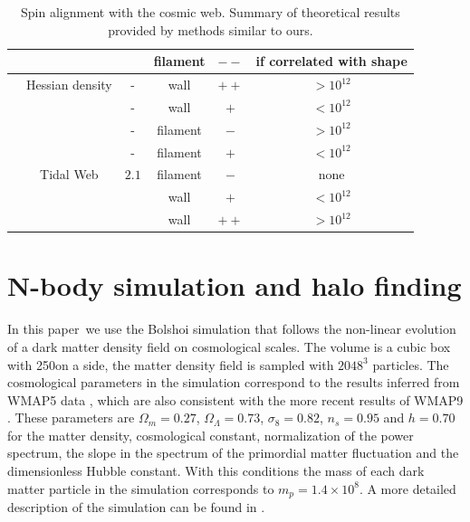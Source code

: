 \documentclass[useAMS,usenatbib]{mn2e}
\newcommand{\documentname}{paper~}
\newcommand{\hMpc}{{\ifmmode{h^{-1}{\rm Mpc}}\else{$h^{-1}$Mpc }\fi}}
\newcommand{\hMsun}{{\ifmmode{h^{-1}{\rm
        {M_{\odot}}}}\else{$h^{-1}{\rm{M_{\odot}}}$}\fi}}
\begin{document}
\begin{table}
\begin{tabular}{cccccc}
& &  & 
filament & $--$ & if correlated with shape\\\hline

\cite{AragonCalvo2007} & Hessian density & - &
wall & $++$ & $>10^{12}$\hMsun\\


& & - &
wall & $+$ & $<10^{12}$\hMsun\\

& & - &
filament& $-$ & $>10^{12}$\hMsun\\


& & - &
filament& $+$ & $<10^{12}$\hMsun\\\hline



\cite{Hahn2007} & Tidal Web & $2.1$ & filament & $-$& none\\

& & &
wall& $+$ & $<10^{12}$\hMsun\\
& &    &
wall & $++$ & $>10^{12}$\hMsun\\\hline \hline

\end{tabular}
\caption{Spin alignment with the cosmic web. Summary of theoretical
  results provided by methods similar to ours.}

\end{table}



\section{N-body simulation and halo finding}
\label{sec:nbody}

In this \documentname we use the Bolshoi simulation that follows the
non-linear evolution of a dark matter density field on cosmological
scales. The volume is a cubic box with 250\hMpc on a side, the matter
density field is sampled with $2048^3$ particles. The  
cosmological parameters in the simulation correspond to the results
inferred from WMAP5 data \citep{2009ApJS..180..306D}, which are also consistent with the more
recent results of WMAP9 \citep{2013ApJS..208...19H}. These parameters are $\Omega_m=0.27$,
$\Omega_{\Lambda} =0.73$, $\sigma_8=0.82$, $n_s=0.95$ and $h=0.70$ for the
matter density, cosmological constant, normalization of the power
spectrum, the slope in the spectrum of the primordial matter
fluctuation and the dimensionless Hubble constant. With this
conditions the mass of each dark matter particle in the simulation
corresponds to $m_p=1.4\times 10^{8}$\hMsun. A more detailed
description of the simulation can be found in
\citep{2011ApJ...740..102K}. 
\end{document}
